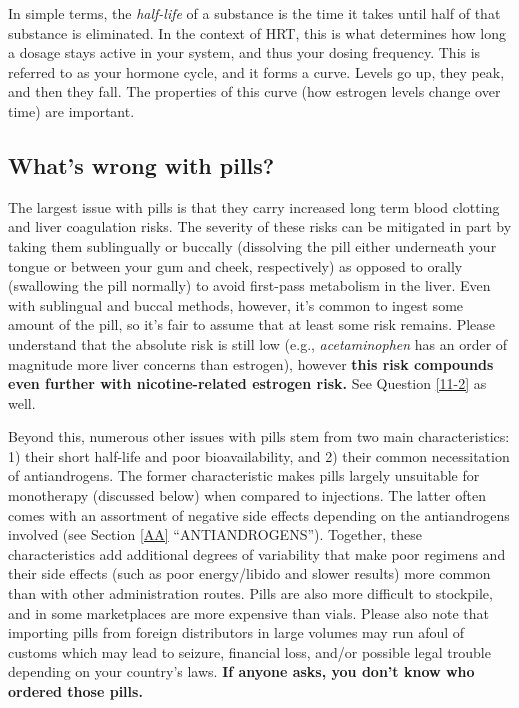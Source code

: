 \documentclass{article}
\begin{document}
In simple terms, the \textit{half-life} of a substance is the time it takes until half of that substance is eliminated. In the context of HRT, this is what determines how long a dosage stays active in your system, and thus your dosing frequency. This is referred to as your hormone cycle, and it forms a curve. Levels go up, they peak, and then they fall. The properties of this curve (how estrogen levels change over time) are important.

\subsection{What’s wrong with pills?}

The largest issue with pills is that they carry increased long term blood clotting and liver coagulation risks. The severity of these risks can be mitigated in part by taking them sublingually or buccally (dissolving the pill either underneath your tongue or between your gum and cheek, respectively) as opposed to orally (swallowing the pill normally) to avoid first-pass metabolism in the liver. Even with sublingual and buccal methods, however, it's common to ingest some amount of the pill, so it’s fair to assume that at least some risk remains. Please understand that the absolute risk is still low (e.g., \textit{acetaminophen} has an order of magnitude more liver concerns than estrogen), however \textbf{this risk compounds even further with nicotine-related estrogen risk.} See Question \ref{11-2} as well.

Beyond this, numerous other issues with pills stem from two main characteristics: 1) their short half-life and poor bioavailability, and 2) their common necessitation of antiandrogens. The former characteristic makes pills largely unsuitable for monotherapy (discussed below) when compared to injections. The latter often comes with an assortment of negative side effects depending on the antiandrogens involved (see Section \ref{AA} “ANTIANDROGENS”). Together, these characteristics add additional degrees of variability that make poor regimens and their side effects (such as poor energy/libido and slower results) more common than with other administration routes. Pills are also more difficult to stockpile, and in some marketplaces are more expensive than vials. Please also note that importing pills from foreign distributors in large volumes may run afoul of customs which may lead to seizure, financial loss, and/or possible legal trouble depending on your country's laws. \textbf{If anyone asks, you don't know who ordered those pills.}
\end{document}

